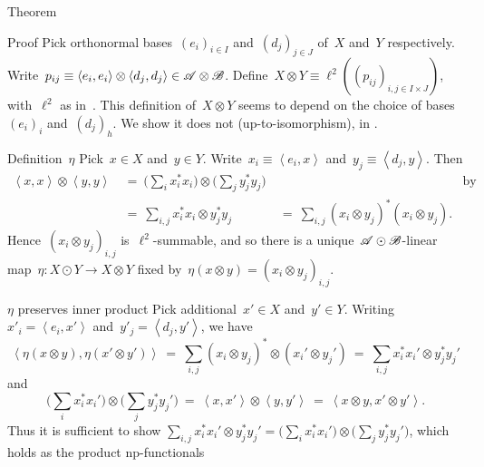 \begin{parsec}
\begin{point}{Theorem}
\begin{enumerate}
\end{enumerate}
\begin{point}{Proof}%
Pick orthonormal bases~$(e_i)_{i \in I}$ and~$(d_j)_{j \in J}$ of~$X$
    and~$Y$ respectively.
Write~$p_{ij} \equiv \left<e_i, e_i\right>\otimes \left<d_j,d_j\right>
    \in \mathscr{A} \otimes \mathscr{B}$.
Define~$X \otimes Y \equiv \ell^2((p_{ij})_{i,j \in I\times J})$,
    with~$\ell^2$ as in~.
This definition of~$X \otimes Y$ seems to depend
    on the choice of bases~$(e_i)_i$ and~$(d_j)_h$.
    We show it does not (up-to-isomorphism), in .
\begin{point}{Definition~$\eta$}%
Pick~$x \in X$ and~$y \in Y$.
Write~$x_i \equiv \left<e_i, x\right>$
and~$y_j \equiv \left<d_j, y\right>$.
Then
\begin{align*}
    \left<x,x\right> \otimes \left<y,y\right>
    &\ = \ \bigl( \sum_i x_i^*x_i\bigr) \otimes\bigl(\sum_jy_j^*y_j\bigr)
            &\quad&\text{by Parseval}  \\
            &\ = \ \sum_{i,j}  x_i^*x_i  \otimes y_j^*y_j  %
            &\ = \ \sum_{i,j}  (x_i \otimes y_j)^* (x_i  \otimes y_j).
\end{align*}
Hence~$(x_i \otimes y_j)_{i,j}$ is~$\ell^2$-summable,
    and so there is a unique~$\mathscr{A} \odot\mathscr{B}$-linear
    map~$\eta\colon X \odot Y \to X \otimes Y$ fixed
    by~$\eta(x \otimes y) = (x_i \otimes y_j)_{i,j}$.
\end{point}
\begin{point}{$\eta$ preserves inner product}%
Pick additional~$x' \in X$ and~$y' \in Y$.
Writing~$x'_i = \left<e_i,x'\right>$
    and~$y'_j = \left<d_j, y'\right>$,
we have
\begin{equation*}
    \left<\eta(x\otimes y), \eta(x' \otimes y')\right>
    \ = \ \sum_{i,j} (x_i\otimes y_j)^* \otimes (x_i' \otimes y_j')
    \ = \ \sum_{i,j} x_i^*x_i' \otimes y_j^* y_j'
\end{equation*}
and
\begin{equation*}
    \bigl(\sum_i x_i^*x_i'\bigr) \otimes \bigl( \sum_j y_j^* y_j' \bigr)
    \ = \ \left<x,x'\right> \otimes \left<y,y'\right>
    \ = \ \left<x\otimes y,x' \otimes y'\right> .
\end{equation*}
Thus it is sufficient to show
    $\sum_{i,j} x_i^*x_i' \otimes y_j^* y_j'
    = \bigl(\sum_i x_i^*x_i'\bigr) \otimes \bigl( \sum_j y_j^* y_j' \bigr)$,
    which holds as the product np-functionals

\end{point}
\end{point}
\end{point}
\end{parsec}
